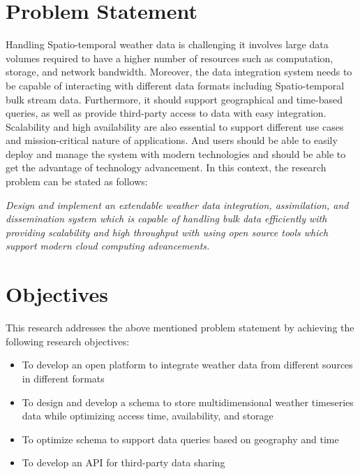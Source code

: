 \section{Problem Statement}
Handling Spatio-temporal weather data is challenging  it involves large data volumes required to have a higher number of resources such as computation, storage, and network bandwidth. Moreover, the data integration system needs to be capable of interacting with different data formats including Spatio-temporal bulk stream data. Furthermore, it should support geographical and time-based queries, as well as provide third-party access to data with easy integration. Scalability and high availability are also essential to support different use cases and mission-critical nature of applications.
And users should be able to easily deploy and manage the system with modern technologies and should be able to get the advantage of technology advancement. In this context, the research problem can be stated as follows:
 
\emph{Design and implement an extendable weather data integration, assimilation, and dissemination system which is capable of handling bulk data efficiently with providing scalability and high throughput with using open source tools which support modern cloud computing advancements.}

\section{Objectives}
This research addresses the above mentioned problem statement by achieving the following research objectives:
\begin{itemize}
    \item To develop an open platform to integrate weather data from different sources in different formats
    \item To design and develop a schema to store multidimensional weather timeseries data while optimizing access time, availability, and storage
    \item To optimize schema to support data queries based on geography and time
    \item To develop an API for third-party data sharing
\end{itemize}
